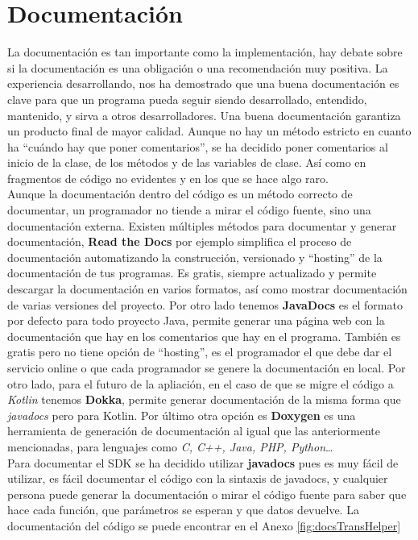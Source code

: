 \section{Documentación}

La documentación es tan importante como la implementación, hay debate sobre si la documentación es una obligación o una recomendación muy positiva. La experiencia desarrollando, nos ha demostrado que una buena documentación es clave para que un programa pueda seguir siendo desarrollado, entendido, mantenido, y sirva a otros desarrolladores. Una buena documentación garantiza un producto final de mayor calidad. Aunque no hay un método estricto en cuanto ha ``cuándo hay que poner comentarios'', se ha decidido poner comentarios al inicio de la clase, de los métodos y de las variables de clase. Así como en fragmentos de código no evidentes y en los que se hace algo raro. \\

Aunque la documentación dentro del código es un método correcto de documentar, un programador no tiende a mirar el código fuente, sino una documentación externa. Existen múltiples métodos para documentar y generar documentación, \textbf{Read the Docs}\cite{readthedocs} por ejemplo simplifica el proceso de documentación automatizando la construcción, versionado y ``hosting'' de la documentación de tus programas. Es gratis, siempre actualizado y permite descargar la documentación en varios formatos, así como mostrar documentación de varias versiones del proyecto. Por otro lado tenemos \textbf{JavaDocs}\cite{javadocs} es el formato por defecto para todo proyecto Java, permite generar una página web con la documentación que hay en los comentarios que hay en el programa. También es gratis pero no tiene opción de ``hosting'', es el programador el que debe dar el servicio online o que cada programador se genere la documentación en local. Por otro lado, para el futuro de la apliación, en el caso de que se migre el código a \emph{Kotlin} tenemos \textbf{Dokka}\cite{dokka}, permite generar documentación de la misma forma que \emph{javadocs} pero para Kotlin. Por último otra opción es \textbf{Doxygen}\cite{doxygen} es una herramienta de generación de documentación al igual que las anteriormente mencionadas, para lenguajes como \emph{C, C++, Java, PHP, Python}\dots\\

Para documentar el SDK se ha decidido utilizar \textbf{javadocs} pues es muy fácil de utilizar, es fácil documentar el código con la sintaxis de javadocs, y cualquier persona puede generar la documentación o mirar el código fuente para saber que hace cada función, que parámetros se esperan y que datos devuelve. La documentación del código se puede encontrar en el Anexo \ref{fig:docsTransHelper}


